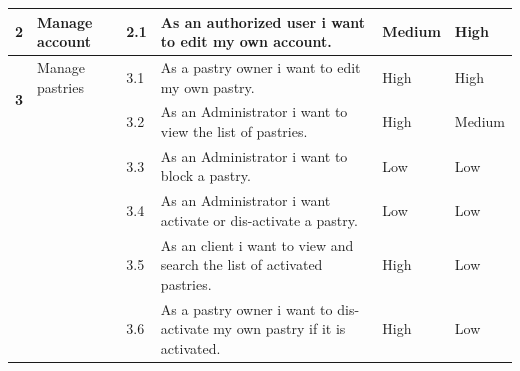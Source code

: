 \documentclass[12pt,a4paper]{report}
\begin{document}
\begin{table}[H]
\begin{center}
\begin{tabular}{|  p{1cm}|  p{4cm}|  p{1cm}| p{5cm}|  p{2cm}| p{2cm}|}
					\\
				\hline
				\multirow{2}{*}{\textbf{2} }
				&                        
				Manage account &                        
				2.1 &                        
				As an authorized user i want to edit my own account.&                        
				Medium &                        
				High
				\\
				\hline
				\multirow{2}{*}{\textbf{3} }
				&                        
				Manage pastries &                        
				3.1 &                        
				As a pastry owner i want to edit my own pastry.&                        
				High &                        
				High
				\\
				\cline{3-6}
				&                        
				&                        
				3.2 &                        
				As an Administrator i want to view the list of pastries.&                        
				High &                        
				Medium
				\\
				\cline{3-6}
				&                        
				&                        
				3.3 &                        
				As an Administrator i want to block a pastry.&                        
				Low &                        
				Low
				\\
				\cline{3-6}
				&                        
				&                        
				3.4 &                        
				As an Administrator i want activate or dis-activate a pastry.&                        
				Low &                        
				Low
				\\
				\cline{3-6}
				&                        
				&                        
				3.5 &                        
				As an client i want to view and search the list of activated pastries.&                        
				High &                        
				Low
					\\
				\cline{3-6}
				&                        
				&                        
				3.6 &                        
				As a pastry owner i want to dis-activate my own pastry if it is activated.&                        
				High &                        
				Low
				
				\\
				\hline
				
			\end{tabular}
			
		\end{center}
		
	\end{table}
\end{document}
